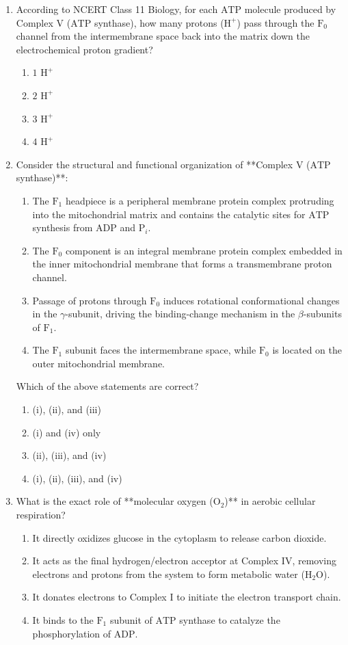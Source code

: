 \documentclass[11pt, a4paper]{article}
\begin{document}
\begin{enumerate}[label=\textbf{\arabic*.}]
\item According to NCERT Class 11 Biology, for each $\text{ATP}$ molecule produced by Complex V ($\text{ATP}$ synthase), how many protons ($\text{H}^+$) pass through the $\text{F}_0$ channel from the intermembrane space back into the matrix down the electrochemical proton gradient?
\begin{enumerate}[label=(\Alph*)]
    \item $1\text{ H}^+$
    \item $2\text{ H}^+$
    \item $3\text{ H}^+$
    \item $4\text{ H}^+$
\end{enumerate}

\item Consider the structural and functional organization of **Complex V ($\text{ATP}$ synthase)**:
\begin{enumerate}[label=(\roman*)]
    \item The $\text{F}_1$ headpiece is a peripheral membrane protein complex protruding into the mitochondrial matrix and contains the catalytic sites for $\text{ATP}$ synthesis from $\text{ADP}$ and $\text{P}_i$.
    \item The $\text{F}_0$ component is an integral membrane protein complex embedded in the inner mitochondrial membrane that forms a transmembrane proton channel.
    \item Passage of protons through $\text{F}_0$ induces rotational conformational changes in the $\gamma$-subunit, driving the binding-change mechanism in the $\beta$-subunits of $\text{F}_1$.
    \item The $\text{F}_1$ subunit faces the intermembrane space, while $\text{F}_0$ is located on the outer mitochondrial membrane.
\end{enumerate}
Which of the above statements are correct?
\begin{enumerate}[label=(\Alph*)]
    \item (i), (ii), and (iii)
    \item (i) and (iv) only
    \item (ii), (iii), and (iv)
    \item (i), (ii), (iii), and (iv)
\end{enumerate}

\item What is the exact role of **molecular oxygen ($\text{O}_2$)** in aerobic cellular respiration?
\begin{enumerate}[label=(\Alph*)]
    \item It directly oxidizes glucose in the cytoplasm to release carbon dioxide.
    \item It acts as the final hydrogen/electron acceptor at Complex IV, removing electrons and protons from the system to form metabolic water ($\text{H}_2\text{O}$).
    \item It donates electrons to Complex I to initiate the electron transport chain.
    \item It binds to the $\text{F}_1$ subunit of $\text{ATP}$ synthase to catalyze the phosphorylation of $\text{ADP}$.
\end{enumerate}


\end{enumerate}
\end{document}
